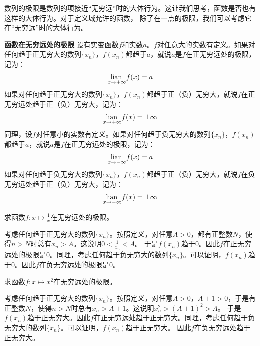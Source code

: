 \documentclass[12pt,UTF8,fontset=none]{ctexbook}
\begin{document}
数列的极限是数列的项接近“无穷远”时的大体行为。这让我们思考，函数是否也有这样的大体行为。对于定义域允许的函数，
除了在一点的极限，我们可以考虑它在“无穷远”时的大体行为。

\begin{df}{\textbf{函数在无穷远处的极限}}
    设有实变函数$f$和实数$a$。$f$对任意大的实数有定义。如果对任何趋于正无穷大的数列$\{x_n\}$，$f(x_n)$都趋于$a$，就说$a$是$f$在正无穷远处的极限，
    记为：
    $$ \underset{x\to +\infty}{\operatorname{lian}\,} f(x) = a$$
    如果对任何趋于正无穷大的数列$\{x_n\}$，$f(x_n)$都趋于正（负）无穷大，就说$f$在正无穷远处趋于正（负）无穷大，记为：
    $$ \underset{x\to +\infty}{\operatorname{lian}\,} f(x) = \pm\infty$$
    同理，设$f$对任意小的实数有定义。如果对任何趋于负无穷大的数列$\{x_n\}$，$f(x_n)$都趋于$a$，就说$a$是$f$在正无穷远处的极限，记为：
    $$ \underset{x\to -\infty}{\operatorname{lian}\,} f(x) = a$$
    如果对任何趋于负无穷大的数列$\{x_n\}$，$f(x_n)$都趋于正（负）无穷大，就说$f$在负无穷远处趋于正（负）无穷大，记为：
    $$ \underset{x\to -\infty}{\operatorname{lian}\,} f(x) = \pm\infty$$
\end{df}

\begin{et}
    求函数$f:x\mapsto \displaystyle\frac{1}{x}$在无穷远处的极限。
\end{et}
\begin{so}
    考虑任何趋于正无穷大的数列$\{x_n\}$。按照定义，对任意$A>0$，都有正整数$N$，使得$n>N$时总有$x_n > A$。这说明$0 < \frac{1}{x_n} < A$。
    于是$f(x_n)$趋于$0$。因此$f$在正无穷远处的极限是$0$。同理，考虑任何趋于负无穷大的数列$\{x_n\}$。可以证明，$f(x_n)$趋于$0$。因此$f$在负无穷远处的极限是$0$。
\end{so}

\begin{et}
    求函数$f:x\mapsto x^2$在无穷远处的极限。
\end{et}
\begin{so}
    考虑任何趋于正无穷大的数列$\{x_n\}$。按照定义，对任意$A>0$，$A+1>0$，于是有正整数$N$，使得$n>N$时总有$x_n > A+1$。这说明$x_n^2 > (A+1)^2 > A$。
    于是$f(x_n)$趋于正无穷大。因此$f$在正无穷远处趋于正无穷大。同理，考虑任何趋于负无穷大的数列$\{x_n\}$。可以证明，$f(x_n)$趋于正无穷大。
    因此$f$在负无穷远处趋于正无穷大。
\end{so}

\end{document}

